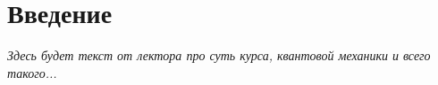 \chapter{Введение}

{\it Здесь будет текст от лектора про суть курса, квантовой механики и всего такого...}